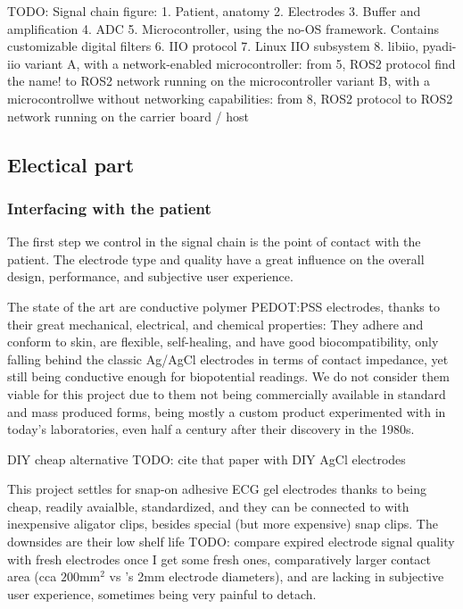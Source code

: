 \documentclass{thesis}
\newcommand{\todo}[1]{{\color{red}TODO: #1}}
\newcommand{\mm}{\unit{\milli\meter}}
\begin{document}
\todo{Signal chain figure:
1. Patient, anatomy
2. Electrodes
3. Buffer and amplification
4. ADC
5. Microcontroller, using the no-OS framework. Contains customizable digital filters
6. IIO protocol
7. Linux IIO subsystem
8. libiio, pyadi-iio
variant A, with a network-enabled microcontroller:
from 5, ROS2 protocol {find the name!} to ROS2 network running on the microcontroller
variant B, with a microcontrollwe without networking capabilities:
from 8, ROS2 protocol to ROS2 network running on the carrier board / host}

\newpage
\subsection{Electical part}

\subsubsection{Interfacing with the patient}

The first step we control in the signal chain is the point of contact with the patient. The electrode type and quality have a great influence on the overall design, performance, and subjective user experience.

The state of the art are conductive polymer PEDOT:PSS electrodes, thanks to their great mechanical, electrical, and chemical properties: They adhere and conform to skin, are flexible, self-healing, and have good biocompatibility, only falling behind the classic Ag/AgCl electrodes in terms of contact impedance, yet still being conductive enough for biopotential readings. \cite{Seiti2023,Hou2024} We do not consider them viable for this project due to them not being commercially available in standard and mass produced forms, being mostly a custom product experimented with in today's laboratories, even half a century after their discovery in the 1980s.

DIY cheap alternative \todo{cite that paper with DIY AgCl electrodes}

This project settles for snap-on adhesive ECG gel electrodes thanks to being cheap, readily avaialble, standardized, and they can be connected to with inexpensive aligator clips, besides special (but more expensive) snap clips. The downsides are their low shelf life \todo{compare expired electrode signal quality with fresh electrodes once I get some fresh ones}, comparatively larger contact area (cca $200\mm^2$ vs \cite{Barbero2012}'s 2mm electrode diameters), and are lacking in subjective user experience, sometimes being very painful to detach.
\end{document}
